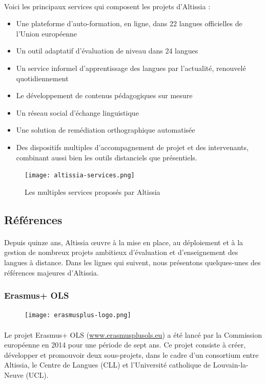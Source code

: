\paragraph{}
Voici les principaux services qui composent les projets d’Altissia :
\begin{itemize}
    \item Une plateforme d’auto-formation, en ligne, dans 22 langues officielles de l’Union européenne
    \item Un outil adaptatif d’évaluation de niveau dans 24 langues
    \item Un service informel d’apprentissage des langues par l’actualité, renouvelé quotidiennement
    \item Le développement de contenus pédagogiques sur mesure
    \item Un réseau social d’échange linguistique
    \item Une solution de remédiation orthographique automatisée
    \item Des dispositifs multiples d’accompagnement de projet et des intervenants, combinant aussi bien les outils distanciels que présentiels.
\end{itemize}
\begin{figure}[ht]
    \centering
    \texttt{[image: altissia-services.png]}
    \caption{Les multiples services proposés par Altissia}
    \label{fig:altissia-services}
\end{figure}

\subsection{Références}
\paragraph{}
Depuis quinze ans, Altissia œuvre à la mise en place, au déploiement et à la gestion de nombreux projets ambitieux d’évaluation et d’enseignement des langues à distance. Dans les lignes qui suivent, nous présentons quelques-unes des références majeures d’Altissia.

\subsubsection{Erasmus+ OLS}
\begin{figure}
    \centering
    \texttt{[image: erasmusplus-logo.png]}
\end{figure}
\paragraph{}
Le projet Erasmus+ OLS (\url{www.erasmusplusols.eu}) a été lancé par la Commission européenne en 2014 pour une période de sept ans. Ce projet consiste à créer, développer et promouvoir deux sous-projets, dans le cadre d’un consortium entre Altissia, le Centre de Langues (CLL) et l’Université catholique de Louvain-la-Neuve (UCL).
 
